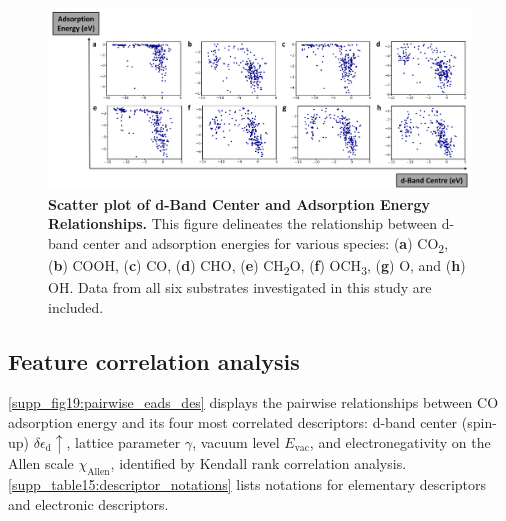 \documentclass[a4paper, 12pt]{article}
\begin{document}
\begin{figure}[htbp]
  \centering
  \includegraphics[width=\textwidth]{supp_fig18_d-band_eads.png}
  \caption{\textbf{Scatter plot of d-Band Center and Adsorption Energy Relationships.}
  This figure delineates the relationship between d-band center and adsorption energies for
  various species: (\textbf{a}) CO\textsubscript{2}, (\textbf{b}) COOH, (\textbf{c}) CO,
  (\textbf{d}) CHO, (\textbf{e}) CH\textsubscript{2}O, (\textbf{f}) OCH\textsubscript{3},
  (\textbf{g}) O, and (\textbf{h}) OH.
  Data from all six substrates investigated in this study are included.}
  \label{supp_fig18:dband_vs_eads}
\end{figure}

\subsection{Feature correlation analysis}
\label{supp_sec3.2_feature_corr}

\cref{supp_fig19:pairwise_eads_des} displays the pairwise relationships between CO adsorption energy
and its four most correlated descriptors: d-band center (spin-up) $\delta\epsilon_{\text{d}}\uparrow$,
lattice parameter $\gamma$, vacuum level $E_\text{vac}$, and electronegativity
on the Allen scale $\chi_\text{Allen}$, identified by Kendall rank correlation analysis.
\cref{supp_table15:descriptor_notations} lists notations for elementary descriptors and electronic descriptors.
\end{document}

